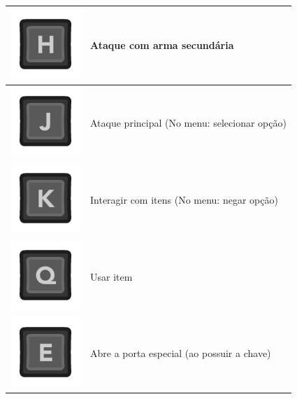 \begin{longtable}{|c|p{10cm}|}
\hline
\includegraphics[scale=0.3]{images/kH.png}
& Ataque com arma secundária
\\
\hline
\includegraphics[scale=0.3]{images/kJ.png}
& Ataque principal (No menu: selecionar opção)
\\
\hline
\includegraphics[scale=0.3]{images/kK.png}
& Interagir com itens (No menu: negar opção)
\\
\hline
\includegraphics[scale=0.3]{images/kQ.png}
& Usar item 
\\
\hline
\includegraphics[scale=0.3]{images/kE.png}
& Abre a porta especial (ao possuir a chave) 
\\
\hline
\end{longtable}

